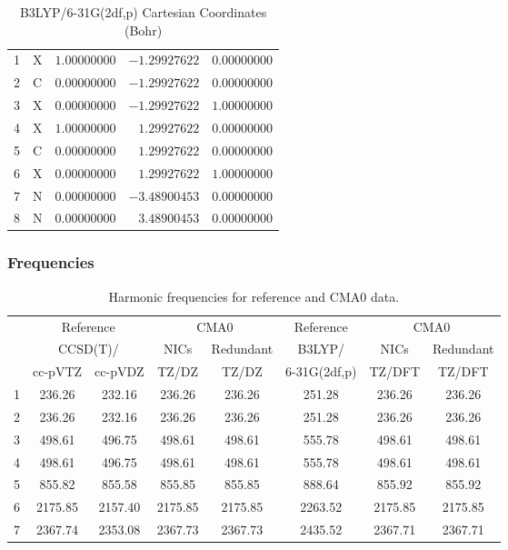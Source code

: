 \documentclass[10pt,oneside]{article}
\begin{document}
\begin{table}[h]
\centering
\caption{B3LYP/6-31G(2df,p) Cartesian Coordinates (Bohr)}
\begin{tabular}{llrrr}
\toprule
1  & X  & $ 1.00000000$ & $-1.29927622$ & $ 0.00000000$ \\
2  & C  & $ 0.00000000$ & $-1.29927622$ & $ 0.00000000$ \\
3  & X  & $ 0.00000000$ & $-1.29927622$ & $ 1.00000000$ \\
4  & X  & $ 1.00000000$ & $ 1.29927622$ & $ 0.00000000$ \\
5  & C  & $ 0.00000000$ & $ 1.29927622$ & $ 0.00000000$ \\
6  & X  & $ 0.00000000$ & $ 1.29927622$ & $ 1.00000000$ \\
7  & N  & $ 0.00000000$ & $-3.48900453$ & $ 0.00000000$ \\
8  & N  & $ 0.00000000$ & $ 3.48900453$ & $ 0.00000000$ \\
\bottomrule
\end{tabular}
\end{table}

\begin{table}[h!]
\subsubsection*{Frequencies}
\centering
\caption{Harmonic frequencies for reference and CMA0 data.}
\begin{tabular}{cccccccc}
\toprule
{} & \multicolumn{2}{c}{Reference} & \multicolumn{2}{c}{CMA0} &    Reference & \multicolumn{2}{c}{CMA0} \\
{} & \multicolumn{2}{c}{CCSD(T)/} &    NICs &  Redundant &       B3LYP/ &    NICs & Redundant \\
{} &   cc-pVTZ & cc-pVDZ &   TZ/DZ &      TZ/DZ & 6-31G(2df,p) &  TZ/DFT &    TZ/DFT \\
\midrule
1 &    236.26 &  232.16 &  236.26 &     236.26 &       251.28 &  236.26 &    236.26 \\
2 &    236.26 &  232.16 &  236.26 &     236.26 &       251.28 &  236.26 &    236.26 \\
3 &    498.61 &  496.75 &  498.61 &     498.61 &       555.78 &  498.61 &    498.61 \\
4 &    498.61 &  496.75 &  498.61 &     498.61 &       555.78 &  498.61 &    498.61 \\
5 &    855.82 &  855.58 &  855.85 &     855.85 &       888.64 &  855.92 &    855.92 \\
6 &   2175.85 & 2157.40 & 2175.85 &    2175.85 &      2263.52 & 2175.85 &   2175.85 \\
7 &   2367.74 & 2353.08 & 2367.73 &    2367.73 &      2435.52 & 2367.71 &   2367.71 \\
\bottomrule
\end{tabular}
\end{table}
\end{document}
